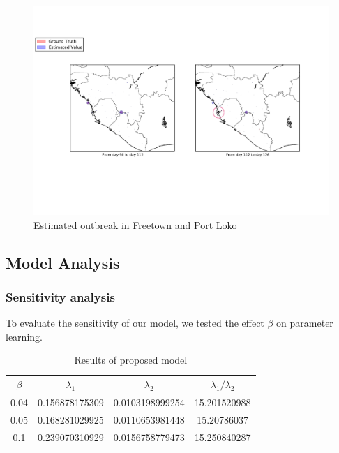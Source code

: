 \documentclass[11pt]{article}
\begin{document}
\begin{figure}[hbtp]
\begin{center}
  \includegraphics[width=5.5in]{graph/est22.pdf}
  \caption{Estimated outbreak in Freetown and Port Loko}
  \label{est22}
\end{center}  
\end{figure}




\subsection{Model Analysis}

\subsubsection{Sensitivity analysis}

To evaluate the sensitivity of our model, we tested the effect $\beta$ on parameter learning. 


\begin{table}[hbtp]
\begin{center}
\begin{tabular}{|c|c|c|c|}
\hline
$\beta$ & $\lambda_1$ & $\lambda_2 $ & $\lambda_1 /\lambda_2 $  \\
\hline
0.04 &0.156878175309 & 0.0103198999254 & 15.201520988\\
\hline 
0.05 & 0.168281029925 & 0.0110653981448 & 15.20786037\\
\hline 
0.1 & 0.239070310929 & 0.0156758779473 & 15.250840287\\ 
\hline 





\end{tabular}
\end{center}
\caption{Results of proposed model }
\label{testtable}
\end{table}
 
\end{document}
